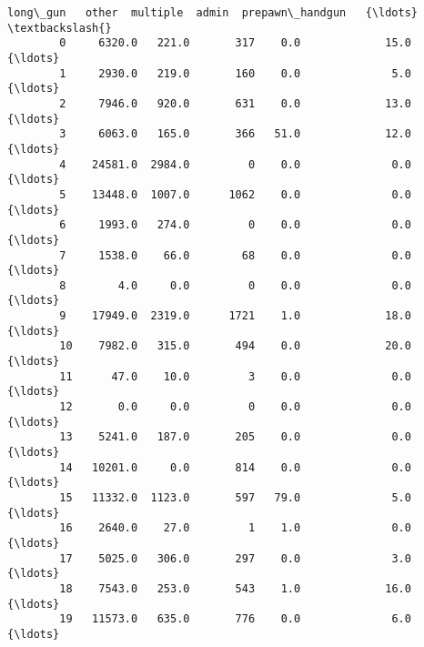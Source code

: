 \documentclass[11pt]{article}
\begin{document}
\begin{Verbatim}[commandchars=\\\{\}]
            long\_gun   other  multiple  admin  prepawn\_handgun   {\ldots}    \textbackslash{}
        0     6320.0   221.0       317    0.0             15.0   {\ldots}     
        1     2930.0   219.0       160    0.0              5.0   {\ldots}     
        2     7946.0   920.0       631    0.0             13.0   {\ldots}     
        3     6063.0   165.0       366   51.0             12.0   {\ldots}     
        4    24581.0  2984.0         0    0.0              0.0   {\ldots}     
        5    13448.0  1007.0      1062    0.0              0.0   {\ldots}     
        6     1993.0   274.0         0    0.0              0.0   {\ldots}     
        7     1538.0    66.0        68    0.0              0.0   {\ldots}     
        8        4.0     0.0         0    0.0              0.0   {\ldots}     
        9    17949.0  2319.0      1721    1.0             18.0   {\ldots}     
        10    7982.0   315.0       494    0.0             20.0   {\ldots}     
        11      47.0    10.0         3    0.0              0.0   {\ldots}     
        12       0.0     0.0         0    0.0              0.0   {\ldots}     
        13    5241.0   187.0       205    0.0              0.0   {\ldots}     
        14   10201.0     0.0       814    0.0              0.0   {\ldots}     
        15   11332.0  1123.0       597   79.0              5.0   {\ldots}     
        16    2640.0    27.0         1    1.0              0.0   {\ldots}     
        17    5025.0   306.0       297    0.0              3.0   {\ldots}     
        18    7543.0   253.0       543    1.0             16.0   {\ldots}     
        19   11573.0   635.0       776    0.0              6.0   {\ldots}     
        

\end{Verbatim}
\end{document}

